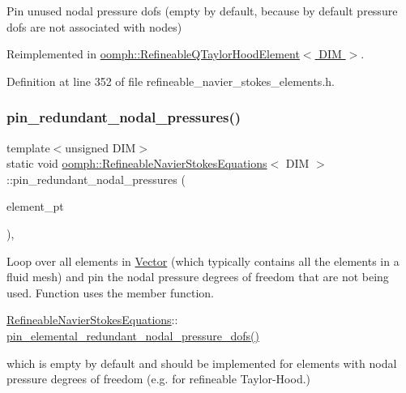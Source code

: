 Pin unused nodal pressure dofs (empty by default, because by default pressure dofs are not associated with nodes) 



Reimplemented in \hyperlink{classoomph_1_1RefineableQTaylorHoodElement_a38bdcf951d151c1d29cf8f908278c1a4}{oomph\+::\+Refineable\+Q\+Taylor\+Hood\+Element$<$ D\+I\+M $>$}.



Definition at line 352 of file refineable\+\_\+navier\+\_\+stokes\+\_\+elements.\+h.

\mbox{\label{classoomph_1_1RefineableNavierStokesEquations_a22a884199639fe295713496e70ae40e5}} 
\subsubsection{\texorpdfstring{pin\+\_\+redundant\+\_\+nodal\+\_\+pressures()}{pin\_redundant\_nodal\_pressures()}}
{\footnotesize\ttfamily template$<$unsigned D\+IM$>$ \\
static void \hyperlink{classoomph_1_1RefineableNavierStokesEquations}{oomph\+::\+Refineable\+Navier\+Stokes\+Equations}$<$ D\+IM $>$\+::pin\+\_\+redundant\+\_\+nodal\+\_\+pressures (\begin{DoxyParamCaption}\item[{const \hyperlink{classoomph_1_1Vector}{Vector}$<$ \hyperlink{classoomph_1_1GeneralisedElement}{Generalised\+Element} $\ast$$>$ \&}]{element\+\_\+pt }\end{DoxyParamCaption})\hspace{0.3cm}{\ttfamily [inline]}, {\ttfamily [static]}}



Loop over all elements in \hyperlink{classoomph_1_1Vector}{Vector} (which typically contains all the elements in a fluid mesh) and pin the nodal pressure degrees of freedom that are not being used. Function uses the member function. 


\begin{DoxyItemize}
\item {\ttfamily \hyperlink{classoomph_1_1RefineableNavierStokesEquations}{Refineable\+Navier\+Stokes\+Equations}\+:}\+: \hyperlink{classoomph_1_1RefineableNavierStokesEquations_a5dbf8764b44554159043a45df312a7e3}{pin\+\_\+elemental\+\_\+redundant\+\_\+nodal\+\_\+pressure\+\_\+dofs()}
\end{DoxyItemize}which is empty by default and should be implemented for elements with nodal pressure degrees of freedom (e.\+g. for refineable Taylor-\/\+Hood.) 

